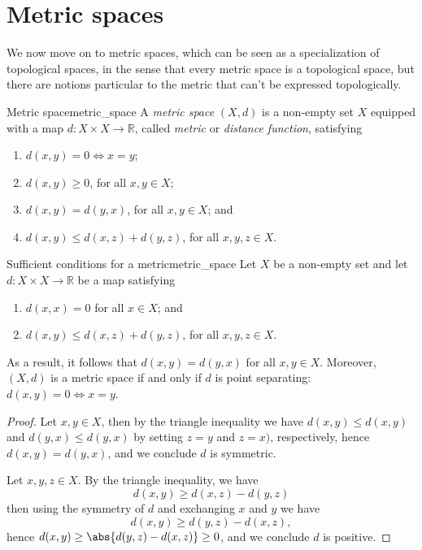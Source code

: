 \section{Metric spaces}
We now move on to metric spaces, which can be seen as a specialization of topological spaces, in the sense that every metric space is a topological space, but there are notions particular to the metric that can't be expressed topologically.
\begin{definition}{Metric space}{metric_space}
    A \emph{metric space} \((X, d)\) is a non-empty set \(X\) equipped with a map \(d : X \times X \to \mathbb{R}\), called \emph{metric} or \emph{distance function}, satisfying
    \begin{enumerate}[label=(\alph*)]
        \item \(d(x,y) = 0 \iff x = y\);
        \item \(d(x, y) \geq 0\), for all \(x, y \in X\);
        \item \(d(x, y) = d(y, x)\), for all \(x, y \in X\); and
        \item \(d(x, y) \leq d(x, z) + d(y,z)\), for all \(x,y,z \in X\).
    \end{enumerate}
\end{definition}

\begin{proposition}{Sufficient conditions for a metric}{metric_space}
    Let \(X\) be a non-empty set and let \(d : X \times X \to \mathbb{R}\) be a map satisfying
    \begin{enumerate}[label=(\alph*)]
        \item \(d(x,x) = 0\) for all \(x \in X\); and
        \item \(d(x, y) \leq d(x, z) + d(y, z)\), for all \(x,y,z \in X\).
    \end{enumerate}
    As a result, it follows that \(d(x, y) = d(y, x)\) for all \(x, y \in X\). Moreover, \((X,d)\) is a metric space if and only if \(d\) is point separating: \(d(x,y) = 0 \iff x = y\).
\end{proposition}
\begin{proof}
    Let \(x, y \in X\), then by the triangle inequality we have \(d(x, y) \leq d(x, y)\) and \(d(y, x) \leq d(y, x)\) by setting \(z = y\) and \(z = x)\), respectively, hence \(d(x,y) = d(y, x)\), and we conclude \(d\) is symmetric.

    Let \(x,y,z \in X\). By the triangle inequality, we have
    \begin{equation*}
        d(x,y) \geq d(x, z) - d(y, z)
    \end{equation*}
    then using the symmetry of \(d\) and exchanging \(x\) and \(y\) we have
    \begin{equation*}
        d(x,y) \geq d(y, z) - d(x, z),
    \end{equation*}
    hence \(d(x, y) \geq \abs{d(y,z) - d(x, z)} \geq 0\), and we conclude \(d\) is positive.
\end{proof}


